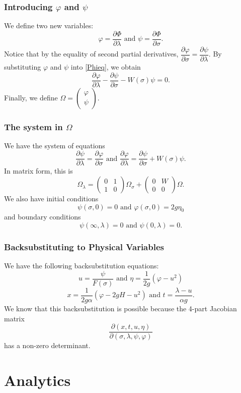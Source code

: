 \begin{frame}
\frametitle{Introducing $\varphi$ and $\psi$}
We define two new variables:
\[
\varphi = \frac{\partial \Phi}{\partial \lambda} \text{ and } \psi = \frac{\partial \Phi}{\partial \sigma}.
\]
Notice that by the equality of second partial derivatives, $\dfrac{\partial \varphi}{\partial \sigma} = \dfrac{\partial \psi}{\partial \lambda}$.
By substituting $\varphi$ and $\psi$ into \eqref{Phieq}, we obtain
\[
\frac{\partial \varphi}{\partial \lambda} - \frac{\partial \psi}{\partial \sigma} - W(\sigma) \psi = 0.
\]
Finally, we define $\Omega = \begin{pmatrix} \varphi \\ \psi \end{pmatrix}$.
\end{frame}

\begin{frame}
\frametitle{The system in $\Omega$}
We have the system of equations
\[
\dfrac{\partial \psi}{\partial \lambda} = \dfrac{\partial \varphi}{\partial \sigma} \text{ and } \frac{\partial \varphi}{\partial \lambda} = \frac{\partial \psi}{\partial \sigma} + W(\sigma) \psi.
\]
In matrix form, this is
\[
\Omega_\lambda = \begin{pmatrix} 0 & 1 \\ 1 & 0 \end{pmatrix} \Omega_\sigma + \begin{pmatrix} 0 & W \\ 0 & 0 \end{pmatrix} \Omega.
\]
We also have initial conditions
\[
\psi(\sigma, 0) = 0 \text{ and } \varphi(\sigma,0) = 2g\eta_0
\]
and boundary conditions
\[
\psi(\infty,\lambda) = 0 \text{ and } \psi(0,\lambda) = 0.
\]
\end{frame}

\begin{frame}
\frametitle{Backsubstituting to Physical Variables}
We have the following backsubstitution equations:
\[
u = \frac{\psi}{F(\sigma)} \text{ and } \eta = \frac{1}{2g}\left(\varphi - u^2\right)
\]
\[
x = \frac{1}{2g\alpha} \left(\varphi - 2gH - u^2 \right) \text{ and } t = \frac{\lambda - u}{\alpha g}.
\]
We know that this backsubstitution is possible because the 4-part Jacobian matrix
\[
\frac{\partial (x,t,u,\eta)}{\partial (\sigma,\lambda,\psi,\varphi)}
\]
has a non-zero determinant.
\end{frame}

\section{Analytics}

